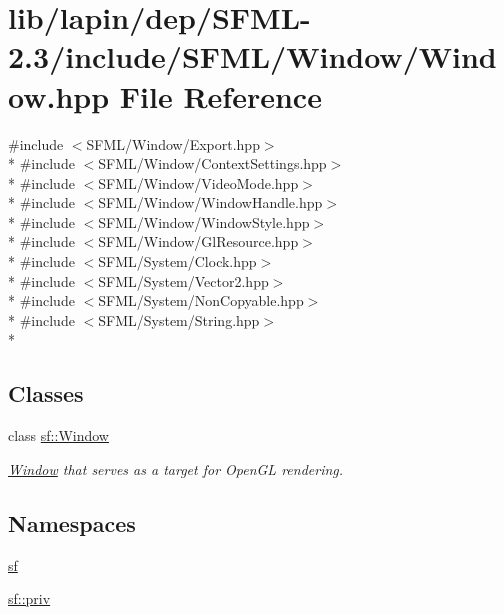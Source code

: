 \hypertarget{lapin_2dep_2_s_f_m_l-2_83_2include_2_s_f_m_l_2_window_2_window_8hpp}{\section{lib/lapin/dep/\-S\-F\-M\-L-\/2.3/include/\-S\-F\-M\-L/\-Window/\-Window.hpp File Reference}
\label{lapin_2dep_2_s_f_m_l-2_83_2include_2_s_f_m_l_2_window_2_window_8hpp}
}
{\ttfamily \#include $<$S\-F\-M\-L/\-Window/\-Export.\-hpp$>$}\\*
{\ttfamily \#include $<$S\-F\-M\-L/\-Window/\-Context\-Settings.\-hpp$>$}\\*
{\ttfamily \#include $<$S\-F\-M\-L/\-Window/\-Video\-Mode.\-hpp$>$}\\*
{\ttfamily \#include $<$S\-F\-M\-L/\-Window/\-Window\-Handle.\-hpp$>$}\\*
{\ttfamily \#include $<$S\-F\-M\-L/\-Window/\-Window\-Style.\-hpp$>$}\\*
{\ttfamily \#include $<$S\-F\-M\-L/\-Window/\-Gl\-Resource.\-hpp$>$}\\*
{\ttfamily \#include $<$S\-F\-M\-L/\-System/\-Clock.\-hpp$>$}\\*
{\ttfamily \#include $<$S\-F\-M\-L/\-System/\-Vector2.\-hpp$>$}\\*
{\ttfamily \#include $<$S\-F\-M\-L/\-System/\-Non\-Copyable.\-hpp$>$}\\*
{\ttfamily \#include $<$S\-F\-M\-L/\-System/\-String.\-hpp$>$}\\*
\subsection*{Classes}
\begin{DoxyCompactItemize}
\item 
class \hyperlink{classsf_1_1_window}{sf\-::\-Window}
\begin{DoxyCompactList}\small\item\em \hyperlink{classsf_1_1_window}{Window} that serves as a target for Open\-G\-L rendering. \end{DoxyCompactList}\end{DoxyCompactItemize}
\subsection*{Namespaces}
\begin{DoxyCompactItemize}
\item 
\hyperlink{namespacesf}{sf}
\item 
\hyperlink{namespacesf_1_1priv}{sf\-::priv}
\end{DoxyCompactItemize}

